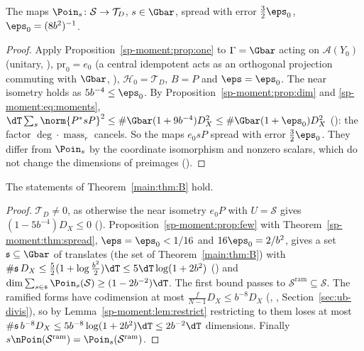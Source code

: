 \begin{theorem}
\label{sp-moment:thm:spread}
The maps $\Poin_s\colon\mathcal S\to\mathcal T_D$, $s\in\Gbar$, spread with error
$\frac32\eps_0$, $\eps_0=(8b^2)^{-1}$.
\end{theorem}

\begin{proof}
Apply Proposition~\ref{sp-moment:prop:one} to $\Gamma=\Gbar$ acting on $\mathcal A(Y_0)$ (unitary,
), $\mathrm{pr}_0=e_0$ (a central idempotent acts as an orthogonal
projection commuting with $\Gbar$, ), $\mathcal H_0=\mathcal T_D$, $B=P$
and $\eps=\eps_0$. The near isometry holds as $5b^{-4}\le\eps_0$. By
Proposition~\ref{sp-moment:prop:dim} and \eqref{sp-moment:eq:moments},
$\dT\sum_s\norm{P^*sP}^2\le\#\Gbar(1+9b^{-4})D_X^2\le\#\Gbar(1+\eps_0)D_X^2$
(): the factor $\deg\cdot
\operatorname{mass}_r$ cancels. So the maps $e_0sP$ spread with error $\frac32\eps_0$. They
differ from $\Poin_s$ by the coordinate isomorphism and nonzero scalars, which do not change the
dimensions of preimages ().
\end{proof}

\begin{theorem}\label{sp-moment:thm:B}
The statements of Theorem~\ref{main:thm:B} hold.
\end{theorem}

\begin{proof}
$\mathcal T_D\ne0$, as otherwise the near isometry $e_0P$ with $U=\mathcal S$ gives $(1-5b^{-4})D_X\le0$
(). Proposition~\ref{sp-moment:prop:few} with
Theorem~\ref{sp-moment:thm:spread}, $\eps=\eps_0<1/16$
and $16\eps_0=2/b^2$, gives a set $\mathfrak s\subseteq\Gbar$ of translates (the set of
Theorem~\ref{main:thm:B}) with $\#\mathfrak s\,D_X\le\frac52(1+\log\frac{b^2}2)\dT\le
5\dT\log(1+2b^2)$ () and
$\dim\sum_{s\in \mathfrak s}\Poin_s(\mathcal S)\ge(1-2b^{-2})\dT$. The first bound passes to
$\mathcal S^{\mathrm{ram}}\subseteq\mathcal S$. The ramified forms have codimension at most
$\frac f{N-1}D_X\le b^{-8}D_X$ (,
, Section~\ref{sec:ub-divis}), so by
Lemma~\ref{sp-moment:lem:restrict} restricting to them loses at most
$\#\mathfrak s\,b^{-8}D_X\le5b^{-8}\log(1+2b^2)\dT\le2b^{-2}\dT$ dimensions. Finally
$s\nPoin(\mathcal S^{\mathrm{ram}})=\Poin_s(\mathcal S^{\mathrm{ram}})$.
\end{proof}

